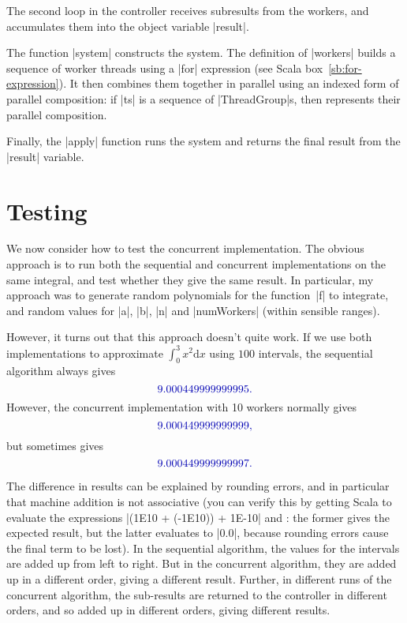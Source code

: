 The second loop in the controller receives subresults from the workers, 
and accumulates them into the object variable |result|.

The function |system| constructs the system.  The definition of |workers|
builds a sequence of worker threads using a |for| expression (see Scala
box~\ref{sb:for-expression}).  It then combines them together in parallel
using an indexed form of parallel composition: if |ts| is a sequence of
|ThreadGroup|s, then  represents their parallel composition.


Finally, the |apply| function runs the system and returns the final result
from the |result| variable. 


\section{Testing}

We now consider how to test the concurrent implementation.  The obvious
approach is to run both the sequential and concurrent implementations on the
same integral, and test whether they give the same result.  In particular, my
approach was to generate random polynomials for the function~|f| to integrate,
and random values for |a|, |b|, |n| and |numWorkers| (within sensible ranges).

However, it turns out that this approach doesn't quite work.  If we use both
implementations to approximate $\int_0^3 x^2 \mbox{d}x$ using $100$ intervals,
the sequential algorithm always gives
\[\mstyle
  9.000449999999995.
\]
However,  the concurrent implementation with 10 workers normally gives
\[\mstyle
  9.000449999999999,
\]
but sometimes gives
\[\mstyle
  9.000449999999997.
\]




The difference in results can be explained by rounding errors, and in
particular that machine addition is not associative (you can verify this by
getting Scala to evaluate the expressions |(1E10 + (-1E10)) + 1E-10| and
: the former gives the expected result, but the
latter evaluates to |0.0|, because rounding errors cause the final term to be
lost). 
%
In the sequential algorithm, the values for the intervals are added up from
left to right.  But in the concurrent algorithm, they are added up in a
different order, giving a different result.  Further, in different runs of the
concurrent algorithm, the sub-results are returned to the controller in
different orders, and so added up in different orders, giving different
results.

